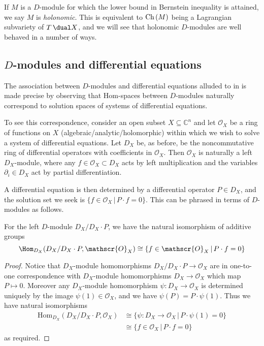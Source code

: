 If \(M\) is a \(D\)-module for which the lower bound in Bernstein inequality is
attained, we say \(M\) is \textit{holonomic}. This is equivalent to
\(\textnormal{Ch}\,(M)\) being a Lagrangian subvariety of \(T\,\dual X\), and we
will see that holonomic \(D\)-modules are well behaved in a number of ways.

\subsection{\texorpdfstring{$D$}{D}-modules and differential equations}
The association between \(D\)-modules and differential equations alluded to in
 is made precise by observing that Hom-spaces
between $D$-modules naturally correspond to solution spaces of systems of
differential equations. 

To see this correspondence, consider an open subset $X\subseteq \mathbb{C}^n$
and let $\mathscr{O}_X$ be a ring of functions on $X$
(algebraic/analytic/holomorphic) within which we wish to solve
a system of differential equations. Let $D_X$ be, as before, be the
noncommutative ring of differential operators with coefficients in
$\mathscr{O}_X$. Then $\mathscr{O}_X$ is naturally a left $D_X$-module, where
any $f\in \mathscr{O}_X\subset D_X$ acts by left multiplication and the
variables $\partial_i\in D_X$ act by partial differentiation. 

A differential equation is then determined by a differential operator \(P\in
D_X\), and the solution set we seek is \(\{f\in \mathscr{O}_X\,|\, P\cdot f =
0\}\). This can be phrased in terms of \(D\)-modules as follows.

\begin{proposition} 
    For the left $D$-module $D_X/D_X\cdot P$, we have the natural isomorphism of
    additive groups 
    \begin{equation*} 
        \Hom_{D_X}(D_X/D_X\cdot P, \mathscr{O}_X)\cong \{f\in\mathscr{O}_X
        \, |\, P\cdot f=0\} 
    \end{equation*} 
    \begin{proof} 
        Notice that \(D_X\)-module homomorphisms \(D_X/D_X\cdot P \rightarrow
        \mathscr{O}_X\) are in one-to-one correspondence with \(D_X\)-module
        homomorphisms \(D_X\rightarrow \mathscr{O}_X\) which map \(P\mapsto 0\).
        Moreover any $D_X$-module homomorphism $\psi: D_X\rightarrow
        \mathscr{O}_X$ is determined uniquely by the image $\psi(1)\in
        \mathscr{O}_X$, and we have \(\psi(P) = P\cdot \psi(1)\). Thus we have
        natural isomorphisms
        \begin{align*} 
            \text{Hom}_{D_X}(D_X/D_X\cdot P, \mathscr{O}_X) 
            &\cong \{\psi: D_X\rightarrow \mathscr{O}_X\,|\, P\cdot \psi(1) =
            0\} \\
            &\cong \{f\in \mathscr{O}_X\,|\, P\cdot f = 0\}
        \end{align*}     
        as required.
    \end{proof}
\end{proposition}

